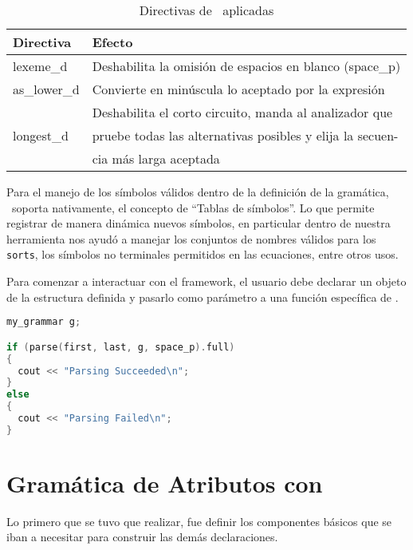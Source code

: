 \begin{table}[!ht]\centering\scriptsize
\begin{tabular}{| l | p{7cm} |}
\hline

\rowcolor{gris} \textbf{Directiva} & \textbf{Efecto} \\ \hline

lexeme\_d    & Deshabilita la omisión de espacios en blanco (space\_p)\\ \hline
as\_lower\_d & Convierte en minúscula lo aceptado por la expresión\\ \hline
\multirow{3}{*}{longest\_d} & Deshabilita el corto circuito, manda al analizador que\\
                            & pruebe todas las alternativas posibles y elija la secuen-\\
                            & cia más larga aceptada \\ \hline
\end{tabular}
\caption{\label{directivas} Directivas de \spirit\ aplicadas}
\end{table}

Para el manejo de los símbolos válidos dentro de la definición de la gramática, \spirit\ soporta nativamente, el concepto de ``Tablas de símbolos''. Lo que permite registrar de manera dinámica nuevos símbolos, en particular dentro de nuestra herramienta nos ayudó a manejar los conjuntos de nombres válidos para los \texttt{sorts}, los símbolos no terminales permitidos en las ecuaciones, entre otros usos.

Para comenzar a interactuar con el framework, el usuario debe declarar un objeto de la estructura definida y pasarlo como parámetro a una función específica de \spirit.

\begin{lstlisting}[float=t!, language=C++, basicstyle=\scriptsize, columns=fullflexible, linewidth=6cm]
my_grammar g;

if (parse(first, last, g, space_p).full)
{
  cout << "Parsing Succeeded\n";
}
else
{
  cout << "Parsing Failed\n";
}
\end{lstlisting}


\section{Gramática de Atributos con \spirit}
\label{sec:gramspirit}
Lo primero que se tuvo que realizar, fue definir los componentes básicos que se iban a necesitar para construir las demás declaraciones.

